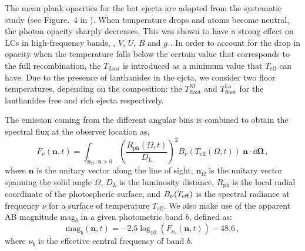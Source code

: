 %
The mean plank opacities for the hot ejecta are adopted from the systematic study 
(see Figure.~4 in \citet{Tanaka:2019iqp}).
When temperature drops and atoms become neutral, the photon opacity sharply decreases. 
This was shown to have a strong effect on 
\acp{LC} in high-frequency bands, \eg, $V$, $U$, $B$ and $g$ \citep{Villar:2017oya}. In order to account 
for the drop in opacity when the temperature falls below the certain value that corresponds to the full 
recombination, the $T_{\text{floor}}$ is introduced \citep{Kasen:2017sxr,Kasen:2018drm} as a minimum value that 
$T_{\text{eff}}$ can have. Due to the presence of lanthanides in the ejcta, 
we consider two floor temperatures, 
depending on the composition: the $T_{\text{floot}}^{\text{Ni}}$ and $T_{\text{floot}}^{\text{La}}$ for 
the lanthanides free and rich ejecta respectively.

The emission coming from the different angular bins is combined to obtain the spectral flux at the observer location as, 
%
\begin{equation}
\label{eq:spectral_flux}
F_{\nu}(\mathbf{n},t) = \int_{\mathbf{n}_{\Omega} \cdot \mathbf{n}> 0} 
\left( \frac{R_{\text{ph}}(\Omega,t)}{D_L} \right)^2  B_{\nu}(T_{\text{eff}}(\Omega,t))~\mathbf{n} \cdot  \dd\boldsymbol{\Omega}\, , 
\end{equation}
%
where $\mathbf{n}$ is the unitary vector along the line of sight, $\mathbf{n}_{\Omega}$ is the unitary 
vector spanning the solid angle $\Omega$, $D_L$ is the luminosity distance, $R_{\text{ph}}$ is the local 
radial coordinate of the photospheric surface, and $B_{\nu}(T_{\rm eff})$ is the spectral radiance at 
frequency $\nu$ for a surface of temperature $T_{\text{eff}}$. 
%
We also make use of the apparent AB magnitude mag$_b$ in a given photometric band $b$, defined as:
%
\begin{equation}
\label{eq:mag}
\text{mag}_b(\mathbf{n},t) = -2.5 \log_{10}\left( F_{\nu_b}(\mathbf{n},t) \right)-48.6\,,
\end{equation}
where $\nu_b$ is the effective central frequency of band $b$.






